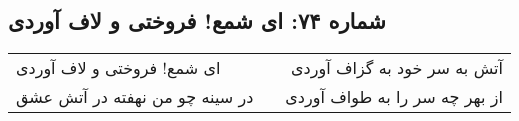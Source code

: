 \begin{center}
\section*{شماره ۷۴: ای شمع! فروختی و لاف آوردی}
\label{sec:074}
\begin{longtable}{l p{0.5cm} r}
ای شمع! فروختی و لاف آوردی
&&
آتش به سر خود به گزاف آوردی
\\
در سینه چو من نهفته در آتش عشق
&&
از بهر چه سر را به طواف آوردی
\\
\end{longtable}
\end{center}
